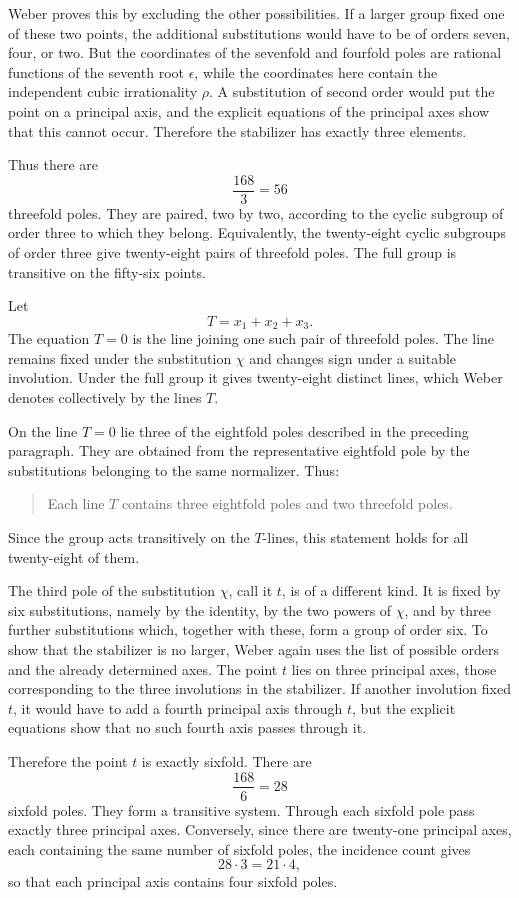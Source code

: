 \documentclass[12pt,a4paper]{article}
\begin{document}
Weber proves this by excluding the other possibilities.  If a larger group fixed one of these two points, the additional substitutions would have to be of orders seven, four, or two.  But the coordinates of the sevenfold and fourfold poles are rational functions of the seventh root \(\epsilon\), while the coordinates here contain the independent cubic irrationality \(\rho\).  A substitution of second order would put the point on a principal axis, and the explicit equations of the principal axes show that this cannot occur.  Therefore the stabilizer has exactly three elements.

Thus there are
\[
 \frac{168}{3}=56
\]
threefold poles.  They are paired, two by two, according to the cyclic subgroup of order three to which they belong.  Equivalently, the twenty-eight cyclic subgroups of order three give twenty-eight pairs of threefold poles.  The full group is transitive on the fifty-six points.

Let
\[
 T=x_1+x_2+x_3.
\]
The equation \(T=0\) is the line joining one such pair of threefold poles.  The line remains fixed under the substitution \(\chi\) and changes sign under a suitable involution.  Under the full group it gives twenty-eight distinct lines, which Weber denotes collectively by the lines \(T\).

On the line \(T=0\) lie three of the eightfold poles described in the preceding paragraph.  They are obtained from the representative eightfold pole by the substitutions belonging to the same normalizer.  Thus:
\begin{quote}
Each line \(T\) contains three eightfold poles and two threefold poles.
\end{quote}
Since the group acts transitively on the \(T\)-lines, this statement holds for all twenty-eight of them.

The third pole of the substitution \(\chi\), call it \(t\), is of a different kind.  It is fixed by six substitutions, namely by the identity, by the two powers of \(\chi\), and by three further substitutions which, together with these, form a group of order six.  To show that the stabilizer is no larger, Weber again uses the list of possible orders and the already determined axes.  The point \(t\) lies on three principal axes, those corresponding to the three involutions in the stabilizer.  If another involution fixed \(t\), it would have to add a fourth principal axis through \(t\), but the explicit equations show that no such fourth axis passes through it.

Therefore the point \(t\) is exactly sixfold.  There are
\[
 \frac{168}{6}=28
\]
sixfold poles.  They form a transitive system.  Through each sixfold pole pass exactly three principal axes.  Conversely, since there are twenty-one principal axes, each containing the same number of sixfold poles, the incidence count gives
\[
 28\cdot 3=21\cdot 4,
\]
so that each principal axis contains four sixfold poles.
\end{document}
